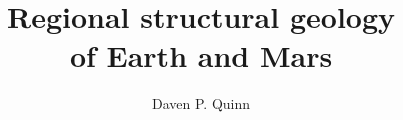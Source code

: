 \documentclass{caltech_thesis}
\title{Regional structural geology\\ of Earth and Mars}
\author{Daven P. Quinn}
\begin{document}
\maketitle

\begin{spacing}{1.4}





\tableofcontents
{}
\listoftables
\listoffigures










\end{spacing}
\end{document}
